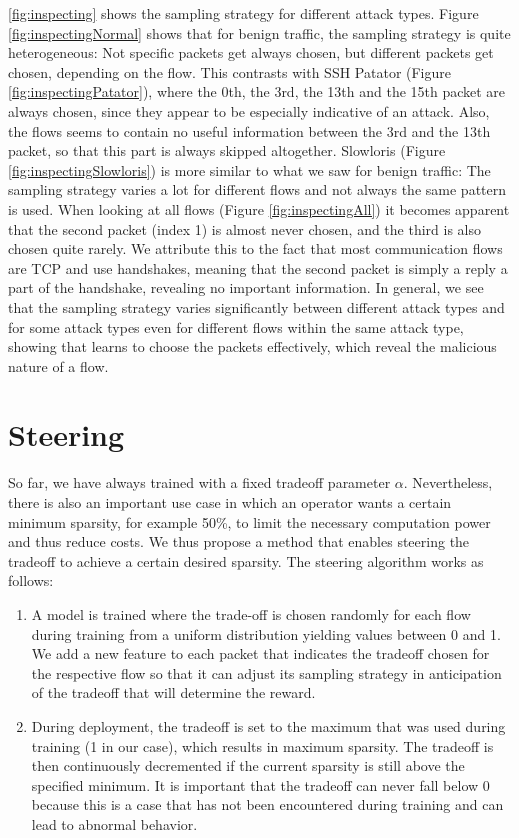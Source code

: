 \documentclass[conference]{IEEEtran}
\begin{document}
\autoref{fig:inspecting} shows the sampling strategy for different attack types. Figure \ref{fig:inspectingNormal} shows that for benign traffic, the sampling strategy is quite heterogeneous: Not specific packets get always chosen, but different packets get chosen, depending on the flow. This contrasts with SSH Patator (Figure \ref{fig:inspectingPatator}), where the 0th, the 3rd, the 13th and the 15th packet are always chosen, since they appear to be especially indicative of an attack. Also, the flows seems to contain no useful information between the 3rd and the 13th packet, so that this part is always skipped altogether. Slowloris (Figure \ref{fig:inspectingSlowloris}) is more similar to what we saw for benign traffic: The sampling strategy varies a lot for different flows and not always the same pattern is used. When looking at all flows (Figure \ref{fig:inspectingAll}) it becomes apparent that the second packet (index 1) is almost never chosen, and the third is also chosen quite rarely. We attribute this to the fact that most communication flows are TCP and use handshakes, meaning that the second packet is simply a reply a part of the handshake, revealing no important information. In general, we see that the sampling strategy varies significantly between different attack types and for some attack types even for different flows within the same attack type, showing that \ours{} learns to choose the packets effectively, which reveal the malicious nature of a flow. 

\section{Steering}

So far, we have always trained \ours{} with a fixed tradeoff parameter $\alpha$. Nevertheless, there is also an important use case in which an operator wants a certain minimum sparsity, for example 50\%, to limit the necessary computation power and thus reduce costs.
We thus propose a method that enables steering the tradeoff to achieve a certain desired sparsity. The steering algorithm works as follows:
\begin{enumerate}
\item A model is trained where the trade-off is chosen randomly for each flow during training from a uniform distribution yielding values between 0 and 1. We add a new feature to each packet that indicates the tradeoff chosen for the respective flow so that it can adjust its sampling strategy in anticipation of the tradeoff that will determine the reward.
\item During deployment, the tradeoff is set to the maximum that was used during training (1 in our case), which results in maximum sparsity. The tradeoff is then continuously decremented if the current sparsity is still above the specified minimum. It is important that the tradeoff can never fall below 0 because this is a case that has not been encountered during training and can lead to abnormal behavior.
\end{enumerate}
\end{document}
